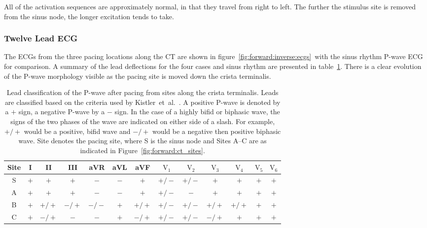 All of the activation sequences are approximately normal, in that they travel
from right to left.
The further the stimulus site is removed from the sinus node, the longer
excitation tends to take.


\subsubsection{Twelve Lead ECG}

The ECGs from the three pacing locations along the CT are shown in
figure~\ref{fig:forward:inverse:ecgs}\ with the sinus rhythm P-wave ECG for
comparison.
A summary of the lead deflections for the four cases and sinus rhythm are
presented in table~\ref{tbl:forward:inverse:ecgs}.
There is a clear evolution of the P-wave morphology visible as the pacing site
is moved down the crista terminalis.

\begin{table}
\caption[Lead classification from pacing sites along the CT]{
\label{tbl:forward:inverse:ecgs}
Lead classification of the P-wave after pacing from sites along the crista
terminalis.
Leads are classified based on the criteria used by
Kistler~et~al.~\cite{Kistler2006}.
A positive P-wave is denoted by a $+$ sign, a negative P-wave by a $-$ sign.
In the case of a highly bifid or biphasic wave, the signs of the two phases of
the wave are indicated on either side of a slash.
For example, $+/+$ would be a positive, bifid wave and $-/+$ would be a negative
then positive biphasic wave.
Site denotes the pacing site, where S is the sinus node and Sites A--C are as
indicated in Figure~\ref{fig:forward:ct_sites}.
}
\begin{center}
\begin{tabular}{c c c c c c c c c c c c c}
\toprule
Site & I & II & III & aVR & aVL & aVF & $\text{V}_{\text{1}}$ &$\text{V}_{\text{2}}$ & $\text{V}_{\text{3}}$ & $\text{V}_{\text{4}}$ & $\text{V}_{\text{5}}$ & $\text{V}_{\text{6}}$\\
\midrule
S   & $+$ & $+$ & $+$ & $-$ & $-$ & $+$ & $+/-$ & $+/-$ & $+$ & $+$ & $+$ & $+$ \\
A   & $+$ & $+$ & $+$ & $-$ & $-$ & $+$ & $+/-$ & $-$ & $+$ & $+$ & $+$ & $+$ \\
B   & $+$ & $+/+$ & $-/+$ & $-/-$ & $+$ & $+/+$ & $+/-$ & $+/-$ & $+/+$ & $+/+$ & $+$ & $+$ \\
C   & $+$ & $-/+$ & $-$ & $-$ & $+$ & $-/+$ & $+/-$ & $+/-$ & $-/+$ & $+$ & $+$ & $+$ \\
\bottomrule
\end{tabular}
\end{center}
\end{table}

